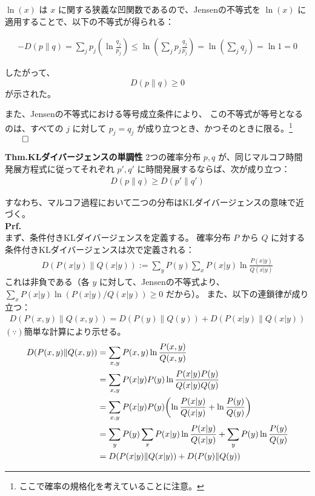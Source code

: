 \documentclass[a4paper,11pt]{jsarticle}
\numberwithin{equation}{section}
\begin{document}
$\ln(x)$ は $x$ に関する狭義な凹関数であるので、Jensenの不等式を $\ln(x)$ に適用することで、以下の不等式が得られる：

\begin{align}
- D(p \| q)
= \sum_j p_j \left( \ln \frac{q_j}{p_j} \right)
\leq \ln \left( \sum_j p_j \frac{q_j}{p_j} \right)
= \ln \left( \sum_j q_j \right)
= \ln 1 = 0
\end{align}

したがって、
\[
D(p \| q) \geq 0
\]
が示された。

また、Jensenの不等式における等号成立条件により、
この不等式が等号となるのは、すべての $j$ に対して $p_j = q_j$ が成り立つとき、かつそのときに限る。\footnote{ここで確率の規格化を考えていることに注意。}$\qed$\\

\begin{itembox}[l]{\textbf{Thm.KLダイバージェンスの単調性}}
    2つの確率分布 $p, q$ が、同じマルコフ時間発展方程式に従ってそれぞれ $p', q'$ に時間発展するならば、次が成り立つ：
\begin{align}
D(p \| q) \geq D(p' \| q')
\end{align}
\end{itembox}
すなわち、マルコフ過程において二つの分布はKLダイバージェンスの意味で近づく。\\
\textbf{Prf.}  \\
まず、条件付きKLダイバージェンスを定義する。
確率分布 $P$ から $Q$ に対する条件付きKLダイバージェンスは次で定義される：
\begin{align}
D(P(x | y) \| Q(x | y)) := \sum_y P(y) \sum_x P(x | y)
\ln \frac{P(x | y)}{Q(x | y)}
\end{align}
これは非負である（各 $y$ に対して、Jensenの不等式より、
$\sum_x P(x | y) \ln (P(x | y)/Q(x | y)) \geq 0$ だから）。
また、以下の連鎖律が成り立つ：
\begin{align}
D(P(x, y) \| Q(x, y)) = D(P(y) \| Q(y)) + D(P(x | y) \| Q(x | y))
\end{align}
$(\because)$簡単な計算により示せる。\\
\begin{align}
D(P(x, y) \| Q(x, y))
&= \sum_{x, y} P(x, y) \ln \frac{P(x, y)}{Q(x, y)} \\
&= \sum_{x, y} P(x | y) P(y) \ln \frac{P(x | y) P(y)}{Q(x | y) Q(y)} \\
&= \sum_{x, y} P(x | y) P(y) \qty(\ln \frac{P(x | y)}{Q(x | y)} + \ln \frac{P(y)}{Q(y)}) \\
&= \sum_y P(y) \sum_x P(x | y) \ln \frac{P(x | y)}{Q(x | y)} + \sum_y P(y) \ln \frac{P(y)}{Q(y)} \\
&= D(P(x | y) \| Q(x | y)) + D(P(y) \| Q(y))
\end{align}
\end{document}
